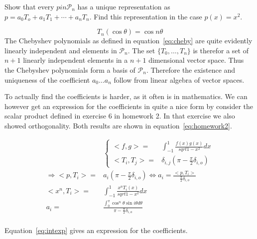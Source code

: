 \begin{problem}
  Show that every $p in \mathcal{P}_n$ has a unique representation as
  $p = a_0 T_o + a_1 T_1 + \cdots + a_n T_n$. Find this representation
  in the case $p(x) = x^2$.
\end{problem}

\begin{solution}
  \begin{equation}
    \label{eq:cheby} T_n(\cos{\theta}) = \cos{n\theta}
  \end{equation} The Chebyshev polynomials as defined in
  equation~\ref{eq:cheby} are quite evidently linearly independent and
  elements in $\mathcal{P}_n$. The set $\{ T_0, \dots , T_n\}$ is
  therefor a set of $n+1$ linearly independent elements in a $n+1$
  dimensional vector space. Thus the Chebyshev polynomials form a basis
  of $\mathcal{P}_n$. Therefore the existence and uniqueness of the
  coefficient $a_0 \dots a_n$ follow from linear algebra of vector
  spaces.

  To actually find the coefficients is harder, as it often is in
  mathematics. We can however get an expression for the coefficients in
  quite a nice form by consider the scalar product defined in exercise 6
  in homework 2. In that exercise we also showed orthogonality. Both
  results are shown in equation~\ref{eq:homework2}.

  \begin{align}
    \label{eq:homework2}
    & \begin{cases}
      <f, g> = & \int_{-1}^{1} \frac{f(x) g(x)}{sqrt{1 - x^2}} dx \\
      <T_i, T_j> = & \delta_{i,j} ( \pi - \frac{\pi}{2}\delta_{i,o} )
    \end{cases} \\
    \nonumber
    \Rightarrow <p, T_i> =  & a_i ( \pi - \frac{\pi}{2}\delta_{i,o} ) 
                              \Leftrightarrow a_i =
                              \frac{<p,T_i>}{\frac{\pi}{2}\delta_{i,o}} \\
    \nonumber 
    <x^n, T_i>  = & \int_{-1}^{1} \frac{x^n T_i(x)}{sqrt{1 - x^2}} dx
    \\
    \label{eq:intexp} 
    a_i = & \frac{\int_0^\pi \cos^{n}\theta \sin{i\theta} d\theta}{\pi
            - \frac{\pi}{2}\delta_{i,o}} \\
  \end{align}

  Equation~\ref{eq:intexp} gives an expression for the coefficients.  
  
\end{solution}




